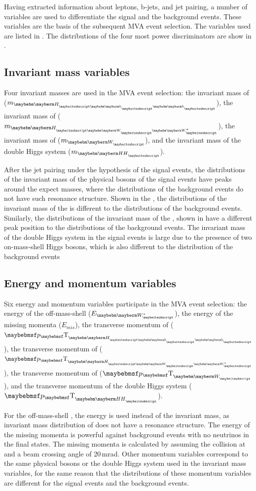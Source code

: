 Having extracted information about leptons, b-jets, and jet pairing, a number of variables are used to differentiate the signal and the background events. These variables are the basis of the subsequent MVA event selection. The variables used are listed in . The distributions of the four most power discriminators are show in .

\subsection{Invariant mass  variables}

Four invariant masses are used in the MVA event selection: the invariant mass of  \Hbb ($m_{\Hbb}$), the invariant mass of  \HWW ($m_{\HWW}$), the invariant mass of  \PW ($m_{\PW}$), and the invariant mass of the double Higgs system ($m_{\HH}$).

After the jet pairing under the hypothesis of the signal events, the distributions of the invariant mass of the physical bosons of the signal events have peaks around the expect masses, where the distributions of the  background events do not have such resonance structure. Shown in the , the distributions of the invariant mass of the \Hbb is  different to the distributions of the background events. Similarly, the distributions of the invariant mass of the \HWW, shown in  have a different peak position to the distributions of the background events.  The invariant mass of the double Higgs system in the signal events is large due to the presence of two on-mass-shell Higgs bosons, which is also different to the distribution of the background events

\subsection{Energy and momentum variables}

Six energy and momentum variables participate in the MVA event selection: the energy of the off-mass-shell \PW ($E_{\W*}$), the energy of the missing momenta ($E_{mis}$), the transverse momentum of \Hbb ($\pT_{\Hbb}$), the transverse momentum of \HWW ($\pT_{\HWW}$), the transverse momentum of \PW ($\pT_{\PW}$), and the transverse momentum of the double Higgs system ($\pT_{\HH}$).

For the off-mass-shell \PW, the energy  is used instead of the invariant mass, as invariant mass distribution of \W* does not have a resonance structure. The energy of the missing momenta is powerful against background events with no neutrinos in the final states. The missing momenta is calculated by assuming the collision at \sqrtS and a beam crossing angle of 20\,mrad. Other momentum variables correspond to the same physical bosons or the double Higgs system used in  the invariant mass  variables, for the same reason that the distributions of these momentum variables are different for the signal events and the background events.


